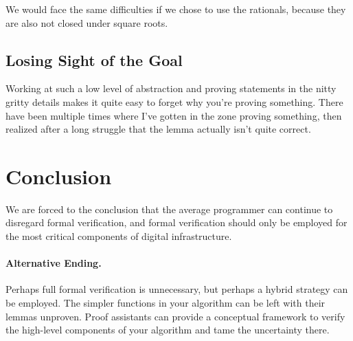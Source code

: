 \documentclass{article}
\begin{document}
We would face the same difficulties if we chose to use the rationals, because they are also not closed under square roots.

\subsection{Losing Sight of the Goal}
Working at such a low level of abstraction and proving statements in the nitty gritty details makes it quite easy to forget why you're proving something.
There have been multiple times where I've gotten in the zone proving something, then realized after a long struggle that the lemma actually isn't quite correct.

\section{Conclusion}
We are forced to the conclusion that the average programmer can continue to disregard formal verification, and formal verification should only be employed for the most critical components of digital infrastructure.

\paragraph{Alternative Ending.}
Perhaps full formal verification is unnecessary, but perhaps a hybrid strategy can be employed.
The simpler functions in your algorithm can be left with their lemmas unproven.
Proof assistants can provide a conceptual framework to verify the high-level components of your algorithm and tame the uncertainty there.



\end{document}
